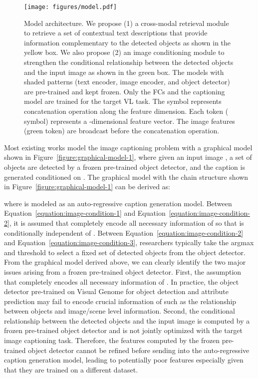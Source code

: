 \documentclass[10pt,twocolumn,letterpaper]{article}
\begin{document}
\begin{figure*}
\centering
\texttt{[image: figures/model.pdf]}
\caption{
Model architecture.
We propose (1) a cross-modal retrieval module to retrieve a set of contextual text descriptions that provide information complementary to the detected objects as shown in the yellow box.
We also propose (2) an image conditioning module to strengthen the conditional relationship between the detected objects and the input image as shown in the green box.
The models with shaded patterns (text encoder, image encoder, and object detector) are pre-trained and kept frozen.
Only the FCs and the captioning model are trained for the target VL task.
The  symbol represents concatenation operation along the feature dimension.
Each token ( symbol) represents a -dimensional feature vector.
The image features (green token) are broadcast before the concatenation operation.
}
\label{figure:model}
\end{figure*}

Most existing works model the image captioning problem with a graphical model shown in Figure~\ref{figure:graphical-model-1}, where given an input image , a set of objects  are detected by a frozen pre-trained object detector, and the caption  is generated conditioned on .
The graphical model with the chain structure shown in Figure~\ref{figure:graphical-model-1} can be derived as:

where  is modeled as an auto-regressive caption generation model.
Between Equation~\ref{equation:image-condition-1} and Equation~\ref{equation:image-condition-2}, it is assumed that  completely encode all necessary information of  so that  is conditionally independent of .
Between Equation~\ref{equation:image-condition-2} and Equation~\ref{equation:image-condition-3}, researchers typically take the argmax and threshold to select a fixed set of detected objects from the object detector.
From the graphical model derived above, we can clearly identify the two major issues arising from a frozen pre-trained object detector.
First, the assumption that  completely encodes all necessary information of .
In practice, the object detector pre-trained on Visual Genome for object detection and attribute prediction may fail to encode crucial information of  such as the relationship between objects and image/scene level information.
Second, the conditional relationship between the detected objects  and the input image  is computed by a frozen pre-trained object detector and is not jointly optimized with the target image captioning task.
Therefore, the features computed by the frozen pre-trained object detector cannot be refined before sending into the auto-regressive caption generation model, leading to potentially poor features especially given that they are trained on a different dataset. 
\end{document}
